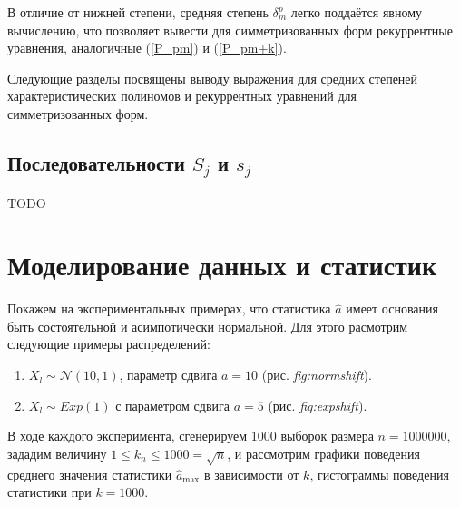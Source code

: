 \documentclass[14pt, a4paper, russian]{report}
\begin{document}
В отличие от нижней степени, средняя степень $\delta_m^p$ легко поддаётся явному вычислению, что позволяет вывести для симметризованных форм рекуррентные уравнения, аналогичные (\ref{P_pm}) и (\ref{P_pm+k}).

Следующие разделы посвящены выводу выражения для средних степеней характеристических полиномов и рекуррентных уравнений для симметризованных форм.

\section{Последовательности $S_j$ и $s_j$}
TODO

\chapter{Моделирование данных и статистик}

Покажем на экспериментальных примерах, что статистика $\hat{a}$ имеет основания быть состоятельной и асимпотически нормальной. Для этого расмотрим следующие примеры распределений:
\begin{enumerate}
  \item $X_l \sim \mathcal{N}(10, 1)$, параметр сдвига $a = 10$ (рис. \textit{fig:normshift}).
  \item $X_l \sim Exp(1)$ с параметром сдвига $a = 5$ (рис. \textit{fig:expshift}).
\end{enumerate}
В ходе каждого эксперимента, сгенерируем 1000 выборок размера $n = 1000000$, зададим величину $1 \le k_n \le 1000 = \sqrt{n}$, и рассмотрим графики поведения среднего значения статистики $\hat{a}_{\max}$ в зависимости от $k$, гистограммы поведения статистики при $k = 1000$.


\end{document}
